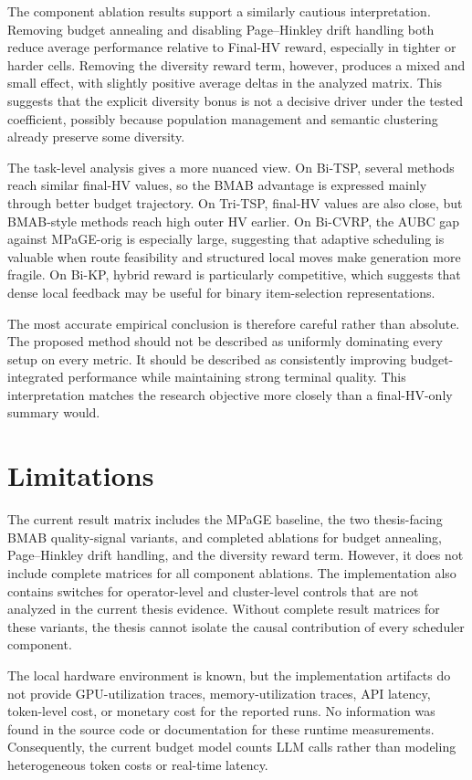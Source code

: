 \documentclass[../main.tex]{subfiles}
\begin{document}
The component ablation results support a similarly cautious interpretation. Removing budget annealing and disabling Page--Hinkley drift handling both reduce average performance relative to Final-HV reward, especially in tighter or harder cells. Removing the diversity reward term, however, produces a mixed and small effect, with slightly positive average deltas in the analyzed matrix. This suggests that the explicit diversity bonus is not a decisive driver under the tested coefficient, possibly because population management and semantic clustering already preserve some diversity.

The task-level analysis gives a more nuanced view. On Bi-TSP, several methods reach similar final-HV values, so the BMAB advantage is expressed mainly through better budget trajectory. On Tri-TSP, final-HV values are also close, but BMAB-style methods reach high outer HV earlier. On Bi-CVRP, the AUBC gap against MPaGE-orig is especially large, suggesting that adaptive scheduling is valuable when route feasibility and structured local moves make generation more fragile. On Bi-KP, hybrid reward is particularly competitive, which suggests that dense local feedback may be useful for binary item-selection representations.

The most accurate empirical conclusion is therefore careful rather than absolute. The proposed method should not be described as uniformly dominating every setup on every metric. It should be described as consistently improving budget-integrated performance while maintaining strong terminal quality. This interpretation matches the research objective more closely than a final-HV-only summary would.

\section{Limitations}

The current result matrix includes the MPaGE baseline, the two thesis-facing BMAB quality-signal variants, and completed ablations for budget annealing, Page--Hinkley drift handling, and the diversity reward term. However, it does not include complete matrices for all component ablations. The implementation also contains switches for operator-level and cluster-level controls that are not analyzed in the current thesis evidence. Without complete result matrices for these variants, the thesis cannot isolate the causal contribution of every scheduler component.

The local hardware environment is known, but the implementation artifacts do not provide GPU-utilization traces, memory-utilization traces, API latency, token-level cost, or monetary cost for the reported runs. No information was found in the source code or documentation for these runtime measurements. Consequently, the current budget model counts LLM calls rather than modeling heterogeneous token costs or real-time latency.
\end{document}
